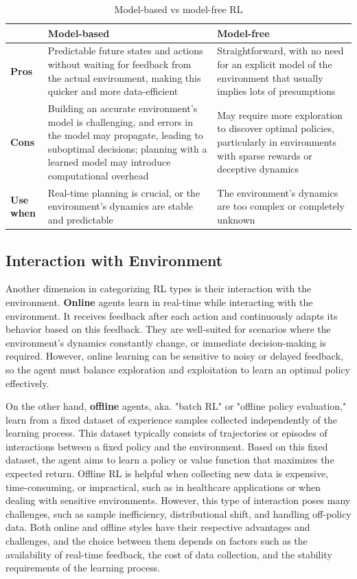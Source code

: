 \documentclass[../main.tex]{subfiles}
\begin{document}
\begin{table}[htbp]
    \centering
    \caption{Model-based vs model-free RL}
    \label{tab:modeled_rl}
    \begin{tabular}{l p{6cm} p{6cm}}
        \toprule
        \textbf{ } & \textbf{Model-based} & \textbf{Model-free} \\
        \midrule
         \textbf{Pros} & Predictable future states and actions without waiting for feedback from the actual environment, making this quicker and more data-efficient & Straightforward, with no need for an explicit model of the environment that usually implies lots of presumptions \\
        \addlinespace
         \textbf{Cons} & Building an accurate environment's model is challenging, and errors in the model may propagate, leading to suboptimal decisions; planning with a learned model may introduce computational overhead & May require more exploration to discover optimal policies, particularly in environments with sparse rewards or deceptive dynamics \\
         \addlinespace
         \textbf{Use when} & Real-time planning is crucial, or the environment's dynamics are stable and predictable & The environment's dynamics are too complex or completely unknown \\
        \bottomrule
    \end{tabular}
\end{table}


\subsection{Interaction with Environment}
Another dimension in categorizing RL types is their interaction with the environment. \textbf{Online} agents learn in real-time while interacting with the environment. It receives feedback after each action and continuously adapts its behavior based on this feedback. They are well-suited for scenarios where the environment's dynamics constantly change, or immediate decision-making is required. However, online learning can be sensitive to noisy or delayed feedback, so the agent must balance exploration and exploitation to learn an optimal policy effectively.

On the other hand, \textbf{offline} agents, aka. "batch RL" or "offline policy evaluation," learn from a fixed dataset of experience samples collected independently of the learning process. This dataset typically consists of trajectories or episodes of interactions between a fixed policy and the environment. Based on this fixed dataset, the agent aims to learn a policy or value function that maximizes the expected return. Offline RL is helpful when collecting new data is expensive, time-consuming, or impractical, such as in healthcare applications or when dealing with sensitive environments. However, this type of interaction poses many challenges, such as sample inefficiency, distributional shift, and handling off-policy data. Both online and offline styles have their respective advantages and challenges, and the choice between them depends on factors such as the availability of real-time feedback, the cost of data collection, and the stability requirements of the learning process.
\end{document}
